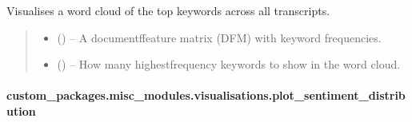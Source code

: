 \documentclass[letterpaper,10pt,english]{sphinxhowto}
\begin{document}
\begin{fulllineitems}
\label{\detokenize{_autosummary/custom_packages.misc_modules.visualisations.word_cloud_visualisation:custom_packages.misc_modules.visualisations.word_cloud_visualisation}}
\pysigstartsignatures
\pysiglinewithargsret
{}
{\sphinxparamcomma {}}
{}
\pysigstopsignatures
\sphinxAtStartPar
Visualises a word cloud of the top keywords across all transcripts.
\begin{quote}\begin{description}
\begin{itemize}
\item {} 
\sphinxAtStartPar
{} () – A document\sphinxhyphen{}ffeature matrix (DFM) with keyword frequencies.

\item {} 
\sphinxAtStartPar
{} () – How many highest\sphinxhyphen{}frequency keywords to show in the word cloud.

\end{itemize}

\sphinxAtStartPar
{}

\end{description}\end{quote}

\end{fulllineitems}


\sphinxstepscope


\paragraph{custom\_packages.misc\_modules.visualisations.plot\_sentiment\_distribution}
\label{\detokenize{_autosummary/custom_packages.misc_modules.visualisations.plot_sentiment_distribution:custom-packages-misc-modules-visualisations-plot-sentiment-distribution}}\label{\detokenize{_autosummary/custom_packages.misc_modules.visualisations.plot_sentiment_distribution::doc}}
\end{document}
